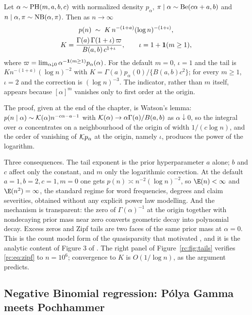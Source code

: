 \begin{theorem}\label{rc:thm:zipf}
Let $\alpha\sim\mathrm{PH}(m,a,b,c)$ with normalized density $p_\alpha$, $\pi\mid\alpha\sim\mathrm{Be}(c\alpha+a,b)$ and $n\mid\alpha,\pi\sim\mathrm{NB}(\alpha,\pi)$. Then as $n\to\infty$
\begin{equation}\label{rc:eq:zipf}
\begin{gathered}
p(n)\;\sim\;K\,n^{-(1+a)}(\log n)^{-(1+\iota)},\\
K=\frac{\Gamma(a)\,\Gamma(1+\iota)\,\varpi}{B(a,b)\,c^{1+\iota}},\qquad \iota=1+\mathbf{1}(m\ge1),
\end{gathered}
\end{equation}
where $\varpi=\lim_{\alpha\downarrow0}\alpha^{-\mathbf{1}(m\ge1)}p_\alpha(\alpha)$. For the default $m=0$, $\iota=1$ and the tail is $Kn^{-(1+a)}(\log n)^{-2}$ with $K=\Gamma(a)p_\alpha(0)/\{B(a,b)c^2\}$; for every $m\ge1$, $\iota=2$ and the correction is $(\log n)^{-3}$. The indicator, rather than $m$ itself, appears because $[\alpha]^m$ vanishes only to first order at the origin.
\end{theorem}

The proof, given at the end of the chapter, is Watson's lemma: $p(n\mid\alpha)\sim\mathcal{K}(\alpha)n^{-c\alpha-a-1}$ with $\mathcal{K}(\alpha)\to\alpha\Gamma(a)/B(a,b)$ as $\alpha\downarrow0$, so the integral over $\alpha$ concentrates on a neighbourhood of the origin of width $1/(c\log n)$, and the order of vanishing of $\mathcal{K} p_\alpha$ at the origin, namely $\iota$, produces the power of the logarithm.

Three consequences. The tail exponent is the prior hyperparameter $a$ alone; $b$ and $c$ affect only the constant, and $m$ only the logarithmic correction. At the default $a=1,b=2,c=1,m=0$ one gets $p(n)\asymp n^{-2}(\log n)^{-2}$, so $\E(n)<\infty$ and $\E(n^2)=\infty$, the standard regime for word frequencies, degrees and claim severities, obtained without any explicit power law modelling. And the mechanism is transparent: the zero of $\Gamma(\alpha)^{-1}$ at the origin together with nondecaying prior mass near zero converts geometric decay into polynomial decay. Excess zeros and Zipf tails are two faces of the same prior mass at $\alpha=0$. This is the count model form of the quasisparsity that motivated \citet{rc:datta2016}, and it is the analytic content of Figure 3 of \citet{rc:wang2024}. The right panel of Figure~\ref{rc:fig:tails} verifies \eqref{rc:eq:zipf} to $n=10^6$; convergence to $K$ is $O(1/\log n)$, as the argument predicts.

\subsection{Negative Binomial regression: P\'olya Gamma meets Pochhammer}

